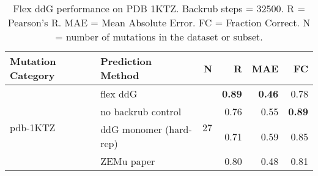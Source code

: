 \begin{table}
  \begin{tabular}{llrrrr}
\toprule
Mutation Category &       Prediction Method &   N &    R &  MAE &   FC \\
\midrule
 \multirow{ 4}{*}{pdb-1KTZ} & flex ddG & \multirow{ 4}{*}{27} & \textbf{0.89} & \textbf{0.46} & 0.78  \\
 & no backrub control & & 0.76 & 0.55 & \textbf{0.89}  \\
 & ddG monomer (hard-rep) & & 0.71 & 0.59 & 0.85  \\
 & ZEMu paper & & 0.80 & 0.48 & 0.81  \\
\bottomrule
\end{tabular}
  \caption[Flex ddG performance on PDB 1KTZ]{
    Flex ddG performance on PDB 1KTZ. Backrub steps = 32500. R = Pearson's R. MAE = Mean Absolute Error. FC = Fraction Correct. N = number of mutations in the dataset or subset.
  } \label{tab:table-pdb-1KTZ}
\end{table}
